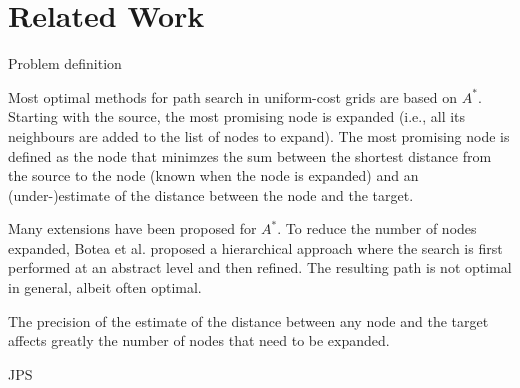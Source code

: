 \section{Related Work}

Problem definition

Most optimal methods for path search in uniform-cost grids are based on $A^*$.  
Starting with the source, 
the most promising node is expanded 
(i.e., all its neighbours are added to the list of nodes to expand).  
The most promising node is defined as the node 
that minimzes the sum 
between the shortest distance from the source to the node 
(known when the node is expanded) 
and an (under-)estimate of the distance between the node and the target.  

Many extensions have been proposed for $A^*$.  
To reduce the number of nodes expanded, 
Botea et al. \cite{botea04} proposed a hierarchical approach
where the search is first performed at an abstract level 
and then refined.  
The resulting path is not optimal in general, 
albeit often optimal.  

The precision of the estimate of the distance 
between any node and the target 
affects greatly the number of nodes that need to be expanded.  


JPS

